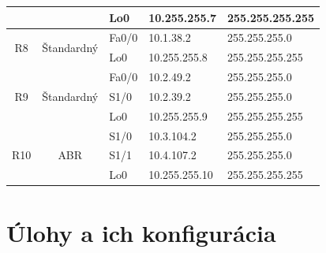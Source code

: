 \documentclass[12pt,twoside,a4paper]{report}
\begin{document}
\begin{table}[!htb]
\begin{tabular}{|c|c|l|l|l|}
                     &                                         & Lo0                                     & 10.255.255.7                            & 255.255.255.255                     \\ \hline
\multirow{2}{*}{R8}  & \multirow{2}{*}{Štandardný}             & Fa0/0                                   & 10.1.38.2                               & 255.255.255.0                       \\ \cline{3-5} 
                     &                                         & Lo0                                     & 10.255.255.8                            & 255.255.255.255                     \\ \hline
\multirow{3}{*}{R9}  & \multirow{3}{*}{Štandardný}             & Fa0/0                                   & 10.2.49.2                               & 255.255.255.0                       \\ \cline{3-5} 
                     &                                         & S1/0                                    & 10.2.39.2                               & 255.255.255.0                       \\ \cline{3-5} 
                     &                                         & Lo0                                     & 10.255.255.9                            & 255.255.255.255                     \\ \hline
\multirow{3}{*}{R10} & \multirow{3}{*}{ABR}                    & S1/0                                    & 10.3.104.2                              & 255.255.255.0                       \\ \cline{3-5} 
                     &                                         & S1/1                                    & 10.4.107.2                              & 255.255.255.0                       \\ \cline{3-5} 
                     &                                         & Lo0                                     & 10.255.255.10                           & 255.255.255.255                     \\ \hline
\end{tabular}
\end{table}


\newpage


\section{Úlohy a ich konfigurácia}
\end{document}
